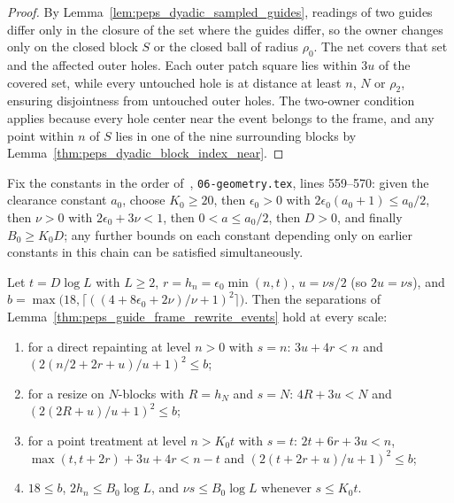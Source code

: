 \begin{proof}\leanok
    By Lemma~\ref{lem:peps_dyadic_sampled_guides}, readings of two guides differ only in the closure of the set where the
    guides differ, so the owner changes only on the closed block $S$ or the closed ball of radius $\rho_0$. The net covers that set and the affected
    outer holes. Each outer patch square lies within $3u$ of the covered set,
    while every untouched hole is at distance at least $n$, $N$ or $\rho_2$, ensuring disjointness from untouched outer holes. The two-owner condition applies because
    every hole center near the event belongs to the frame, and any
    point within $n$ of $S$ lies in one of the nine surrounding blocks by Lemma~\ref{thm:peps_dyadic_block_index_near}.
\end{proof}

\begin{lemma}
    \label{thm:peps_protocol_constants}
    \leanok
    Fix the constants in the order of~\cite[Section~7]{OpenAI2026PolynomialPEPS},
    \texttt{06-geometry.tex}, lines 559--570: given the clearance constant $a_0$, choose $K_0\ge20$, then $\epsilon_0>0$ with
    $2\epsilon_0(a_0+1)\le a_0/2$, then $\nu>0$ with $2\epsilon_0+3\nu<1$, then
    $0<a\le a_0/2$, then $D>0$, and finally $B_0\ge K_0D$; any further bounds on each constant depending only on earlier constants in this chain can be satisfied simultaneously.

    Let $t=D\log L$ with $L\ge2$, $r=h_n=\epsilon_0\min(n,t)$, $u=\nu s/2$ (so $2u=\nu s$), and
    $b=\max\bigl(18,\lceil((4+8\epsilon_0+2\nu)/\nu+1)^2\rceil\bigr)$. Then
    the separations of Lemma~\ref{thm:peps_guide_frame_rewrite_events} hold at
    every scale:
    \begin{enumerate}
        \item for a direct repainting at level $n>0$ with $s=n$:
              $3u+4r<n$ and $(2(n/2+2r+u)/u+1)^2\le b$;
        \item for a resize on $N$-blocks with $R=h_N$ and $s=N$: $4R+3u<N$ and $(2(2R+u)/u+1)^2\le b$;
        \item for a point treatment at level $n>K_0t$ with $s=t$:
              $2t+6r+3u<n$, $\max(t,t+2r)+3u+4r<n-t$ and
              $(2(t+2r+u)/u+1)^2\le b$;
        \item $18\le b$, $2h_n\le B_0\log L$, and $\nu s\le B_0\log L$ whenever $s\le K_0t$.
    \end{enumerate}
\end{lemma}

